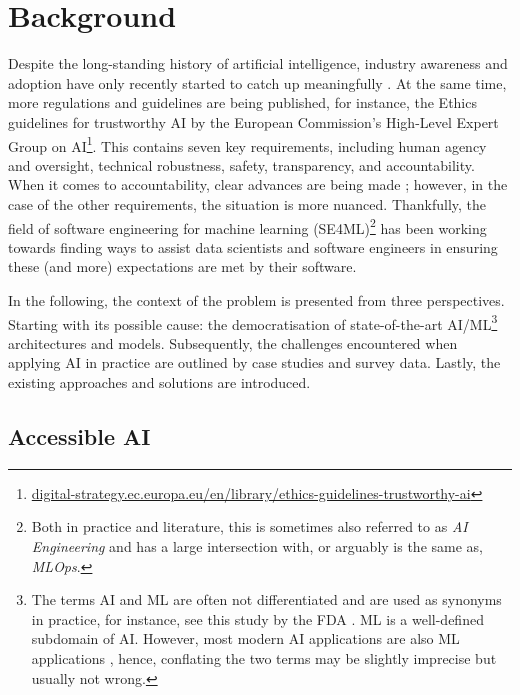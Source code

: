 \chapter{Background} \label{chapter:background}

Despite the long-standing history of artificial intelligence, industry awareness and adoption have only recently started to catch up meaningfully \cite{wirtz2019artificial}. At the same time, more regulations and guidelines are being published, for instance, the Ethics guidelines for trustworthy AI by the European Commission's High-Level Expert Group on AI\footnote{\href{https://digital-strategy.ec.europa.eu/en/library/ethics-guidelines-trustworthy-ai}{digital-strategy.ec.europa.eu/en/library/ethics-guidelines-trustworthy-ai}}. This contains seven key requirements, including human agency and oversight, technical robustness, safety, transparency, and accountability. When it comes to accountability, clear advances are being made \cite{raji2020closing}; however, in the case of the other requirements, the situation is more nuanced. Thankfully, the field of software engineering for machine learning (SE4ML)\footnote{Both in practice and literature, this is sometimes also referred to as \textit{AI Engineering} and has a large intersection with, or arguably is the same as, \textit{MLOps}.} has been working towards finding ways to assist data scientists and software engineers in ensuring these (and more) expectations are met by their software.

In the following, the context of the problem is presented from three perspectives. Starting with its possible cause: the democratisation of state-of-the-art AI/ML\footnote{The terms AI and ML are often not differentiated and are used as synonyms in practice, for instance, see this study by the FDA \cite{food2019proposed}. ML is a well-defined subdomain of AI. However, most modern AI applications are also ML applications \cite{russell2010artificial}, hence, conflating the two terms may be slightly imprecise but usually not wrong.} architectures and models. Subsequently, the challenges encountered when applying AI in practice are outlined by case studies and survey data. Lastly, the existing approaches and solutions are introduced.

\section{Accessible AI} \label{section:accessible-ai}

